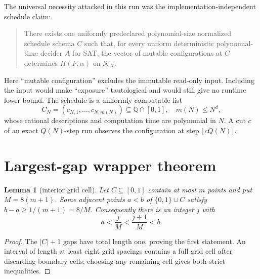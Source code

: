 \documentclass[11pt]{article}
\newtheorem{lemma}{Lemma}
\begin{document}
The universal necessity attacked in this run was the implementation-independent
schedule claim:
\begin{quote}
There exists one uniformly predeclared polynomial-size normalized schedule schema $C$
such that, for every uniform deterministic polynomial-time decider $A$ for SAT, the
vector of mutable configurations at $C$ determines $H(F,\alpha)$ on $\mathcal K_N$.
\end{quote}
Here ``mutable configuration'' excludes the immutable read-only input.  Including the
input would make ``exposure'' tautological and would still give no runtime lower bound.
The schedule is a uniformly computable list
\[
 C_N=(c_{N,1},\ldots,c_{N,m(N)})\subseteq\mathbb Q\cap[0,1],
 \quad m(N)\le N^d,
\]
whose rational descriptions and computation time are polynomial in $N$.  A cut $c$ of an
exact $Q(N)$-step run observes the configuration at step $\lfloor cQ(N)\rfloor$.

\section{Largest-gap wrapper theorem}

\begin{lemma}[interior grid cell]
Let $C\subseteq[0,1]$ contain at most $m$ points and put $M=8(m+1)$.  Some adjacent
points $a<b$ of $\{0,1\}\cup C$ satisfy $b-a\ge 1/(m+1)=8/M$.  Consequently there is an
integer $j$ with
\[
 a<\frac jM<\frac{j+1}{M}<b.
\]
\end{lemma}
\begin{proof}
The $|C|+1$ gaps have total length one, proving the first statement.  An interval of
length at least eight grid spacings contains a full grid cell after discarding boundary
cells; choosing any remaining cell gives both strict inequalities.
\end{proof}
\end{document}
